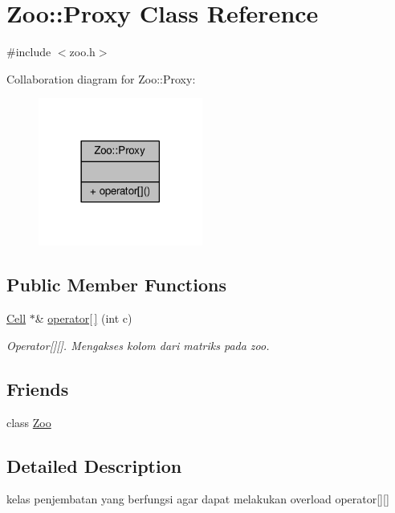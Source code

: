 \hypertarget{classZoo_1_1Proxy}{}\section{Zoo\+:\+:Proxy Class Reference}
\label{classZoo_1_1Proxy}


{\ttfamily \#include $<$zoo.\+h$>$}



Collaboration diagram for Zoo\+:\+:Proxy\+:
\nopagebreak
\begin{figure}[H]
\begin{center}
\leavevmode
\includegraphics[width=153pt]{classZoo_1_1Proxy__coll__graph}
\end{center}
\end{figure}
\subsection*{Public Member Functions}
\begin{DoxyCompactItemize}
\item 
\hyperlink{classCell}{Cell} $\ast$\& \hyperlink{classZoo_1_1Proxy_aeec5b3774a3566298b8fd672a30bf422}{operator\mbox{[}$\,$\mbox{]}} (int c)
\begin{DoxyCompactList}\small\item\em Operator\mbox{[}\mbox{]}\mbox{[}\mbox{]}. Mengakses kolom dari matriks pada zoo. \end{DoxyCompactList}\end{DoxyCompactItemize}
\subsection*{Friends}
\begin{DoxyCompactItemize}
\item 
class \hyperlink{classZoo_1_1Proxy_a7e530ae9a524cd92c4deed6deeb35b15}{Zoo}
\end{DoxyCompactItemize}


\subsection{Detailed Description}
kelas penjembatan yang berfungsi agar dapat melakukan overload operator\mbox{[}\mbox{]}\mbox{[}\mbox{]} 

